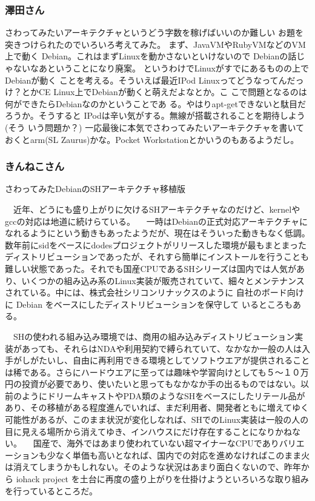 \documentclass[mingoth]{jsarticle}
\begin{document}
\subsubsection{澤田さん}

さわってみたいアーキテクチャというどう字数を稼げばいいのか難しい 
お題を突きつけられたのでいろいろ考えてみた。
まず、JavaVMやRubyVMなどのVM上で動く 
Debian。これはまずLinuxを動かさないといけないので 
Debianの話じゃないなあということになり廃案。
というわけでLinuxがすでにあるものの上でDebianが動く 
ことを考える。そういえば最近IPod Linuxってどうなってんだっ 
け？とかCE Linux上でDebianが動くと萌えだよなとか。こ 
こで問題となるのは何ができたらDebianなのかということであ 
る。やはりapt-getできないと駄目だろうか。そうすると 
IPodは辛い気がする。無線が搭載されることを期待しよう(そう 
いう問題か？)
一応最後に本気でさわってみたいアーキテクチャを書いておくとarm(SL  
Zaurus)かな。Pocket Workstationとかいうのもあるようだし。


\subsubsection{きんねこさん}
さわってみたDebianのSHアーキテクチャ移植版

　近年、どうにも盛り上がりに欠けるSHアーキテクチャなのだけど、kernelやgccの対応は地道に続けらている。
　一時はDebianの正式対応アーキテクチャになれるようにという動きもあったようだが、現在はそういった動きもなく低調。数年前にsidをベースにdodesプロジェクトがリリースした環境が最もまとまったディストリビューションであったが、それすら簡単にインストールを行うことも難しい状態であった。それでも国産CPUであるSHシリーズは国内では人気があり、いくつかの組み込み系のLinux実装が販売されていて、細々とメンテナンスされている。中には、株式会社シリコンリナックスのように
自社のボード向けに Debian をベースにしたディストリビューションを保守して
いるところもある。

　SHの使われる組み込み環境では、商用の組み込みディストリビューション実装があっても、それらはNDAや利用契約で縛られていて、なかなか一般の人は入手がしがたいし、自由に再利用できる環境としてソフトウエアが提供されることは稀である。さらにハードウエアに至っては趣味や学習向けとしても５〜１０万円の投資が必要であり、使いたいと思ってもなかなか手の出るものではない。以前のようにドリームキャストやPDA類のようなSHをベースにしたリテール品があり、その移植がある程度進んでいれば、まだ利用者、開発者ともに増えてゆく可能性があるが、このまま状況が変化しなれば、SHでのLinux実装は一般の人の目に見える場所から消えてゆき、インハウスにだけ存在することになりかねない。
　国産で、海外ではあまり使われていない超マイナーなCPUでありバリエーションも少なく単価も高いとなれば、国内での対応を進めなければこのまま火は消えてしまうかもしれない。そのような状況はあまり面白くないので、昨年から
iohack project を土台に再度の盛り上がりを仕掛けようといろいろな取り組み
を行っているところだ。
\end{document}

